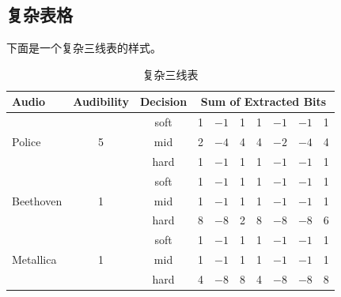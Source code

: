 \subsection{复杂表格}

下面是一个复杂三线表的样式。

\begin{table}[H]
  \centering
  \caption{复杂三线表}
  \begin{tabular}{l c c rrrrrrr}
    \hline\hline
    Audio & Audibility & Decision & \multicolumn{7}{c}{Sum of Extracted Bits}
    \\ [0.5ex]
    \hline
    \multirow{3}{*}{Police} & \multirow{3}{*}{5} & soft & 1 & $-1$ & 1 & 1 & $-1$ & $-1$ & 1 \\
    & & mid & 2 & $-4$ & 4 & 4 & $-2$ & $-4$ & 4 \\
    & & hard & 1 & $-1$ & 1 & 1 & $-1$ & $-1$ & 1 \\
    \multirow{3}{*}{Beethoven} & \multirow{3}{*}{1} & soft & 1 & $-1$ & 1 & 1 & $-1$ & $-1$ & 1 \\
    & & mid & 1 & $-1$ & 1 & 1 & $-1$ & $-1$ & 1 \\
    & & hard & 8 & $-8$ & 2 & 8 & $-8$ & $-8$ & 6 \\
    \multirow{3}{*}{Metallica} & \multirow{3}{*}{1} & soft & 1 & $-1$ & 1 & 1 & $-1$ & $-1$ & 1 \\
    & & mid & 1 & $-1$ & 1 & 1 & $-1$ & $-1$ & 1 \\
    & & hard & 4 & $-8$ & 8 & 4 & $-8$ & $-8$ & 8 \\




    \hline %
  \end{tabular}
  \label{tab:PPer}
\end{table}

